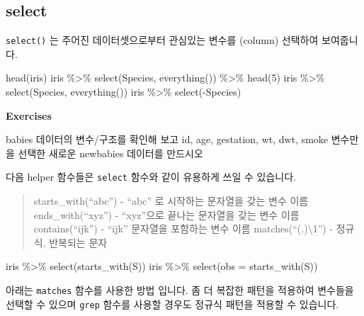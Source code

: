 \documentclass[
]{book}
\newenvironment{Shaded}{\begin{snugshade}}{\end{snugshade}}
\newcommand{\AttributeTok}[1]{\textcolor[rgb]{0.77,0.63,0.00}{#1}}
\newcommand{\DecValTok}[1]{\textcolor[rgb]{0.00,0.00,0.81}{#1}}
\newcommand{\FunctionTok}[1]{\textcolor[rgb]{0.00,0.00,0.00}{#1}}
\newcommand{\NormalTok}[1]{#1}
\newcommand{\SpecialCharTok}[1]{\textcolor[rgb]{0.00,0.00,0.00}{#1}}
\newcommand{\StringTok}[1]{\textcolor[rgb]{0.31,0.60,0.02}{#1}}
\begin{document}
\hypertarget{select}{%
\subsection{select}\label{select}}

\texttt{select()} 는 주어진 데이터셋으로부터 관심있는 변수를 (column) 선택하여 보여줍니다.

\begin{Shaded}
\begin{Highlighting}[]
\FunctionTok{head}\NormalTok{(iris)}
\NormalTok{iris }\SpecialCharTok{\%\textgreater{}\%} \FunctionTok{select}\NormalTok{(Species, }\FunctionTok{everything}\NormalTok{()) }\SpecialCharTok{\%\textgreater{}\%} \FunctionTok{head}\NormalTok{(}\DecValTok{5}\NormalTok{)}
\NormalTok{iris }\SpecialCharTok{\%\textgreater{}\%} \FunctionTok{select}\NormalTok{(Species, }\FunctionTok{everything}\NormalTok{())}
\NormalTok{iris }\SpecialCharTok{\%\textgreater{}\%} \FunctionTok{select}\NormalTok{(}\SpecialCharTok{{-}}\NormalTok{Species)}
\end{Highlighting}
\end{Shaded}

\textbf{Exercises}

babies 데이터의 변수/구조를 확인해 보고 id, age, gestation, wt, dwt, smoke 변수만을 선택한 새로운 newbabies 데이터를 만드시오

다음 helper 함수들은 \texttt{select} 함수와 같이 유용하게 쓰일 수 있습니다.

\begin{quote}
starts\_with(``abc'') - ``abc'' 로 시작하는 문자열을 갖는 변수 이름
ends\_with(``xyz'') - ``xyz''으로 끝나는 문자열을 갖는 변수 이름
contains(``ijk'') - ``ijk'' 문자열을 포함하는 변수 이름
matches(``(.)\textbackslash1'') - 정규식, 반복되는 문자
\end{quote}

\begin{Shaded}
\begin{Highlighting}[]
\NormalTok{iris }\SpecialCharTok{\%\textgreater{}\%} \FunctionTok{select}\NormalTok{(}\FunctionTok{starts\_with}\NormalTok{(}\StringTok{\textquotesingle{}S\textquotesingle{}}\NormalTok{))}
\NormalTok{iris }\SpecialCharTok{\%\textgreater{}\%} \FunctionTok{select}\NormalTok{(}\AttributeTok{obs =} \FunctionTok{starts\_with}\NormalTok{(}\StringTok{\textquotesingle{}S\textquotesingle{}}\NormalTok{))}
\end{Highlighting}
\end{Shaded}

아래는 \texttt{matches} 함수를 사용한 방법 입니다. 좀 더 복잡한 패턴을 적용하여 변수들을 선택할 수 있으며 \texttt{grep} 함수를 사용할 경우도 정규식 패턴을 적용할 수 있습니다.
\end{document}

